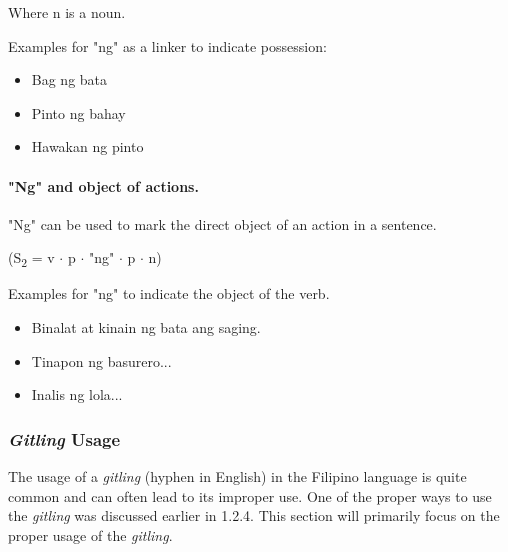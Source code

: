 Where n is a noun. \\

\begin{example}
    Examples for "ng" as a linker to indicate possession:
\end{example}
\begin{itemize}
    \item Bag ng bata
    \item Pinto ng bahay
    \item Hawakan ng pinto
\end{itemize}

\paragraph{"Ng" and object of actions.}"Ng" can be used to mark the direct object
of an action in a sentence.
\begin{center}
    (S\textsubscript{2} = v \(\cdot\) p \(\cdot\) "ng" \(\cdot\) p \(\cdot\) n)
\end{center}

\begin{example}
    Examples for "ng" to indicate the object of the verb.
\end{example}
\begin{itemize}
    \item Binalat at kinain ng bata ang saging.
    \item Tinapon ng basurero...
    \item Inalis ng lola...
\end{itemize}

\subsubsection{\textit{Gitling} Usage}
The usage of a \textit{gitling} (hyphen in English) in the Filipino language is quite common and can often lead to its improper use. One of the proper ways to use the \textit{gitling} was discussed earlier in 1.2.4. This section will primarily focus on the proper usage of the \textit{gitling}.

